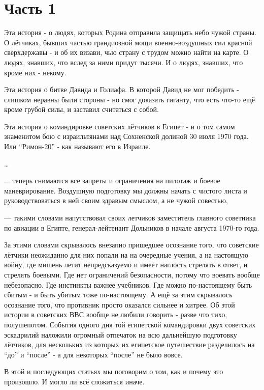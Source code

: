 \chapter{Часть 1}

Эта история - о людях, которых Родина отправила защищать небо чужой страны. О лётчиках, бывших частью грандиозной мощи военно-воздушных сил красной сверхдержавы - и об их визави, чью страну с трудом можно найти на карте. О людях, знавших, что вслед за ними придут тысячи. И о людях, знавших, что кроме них - некому.

Эта история о битве Давида и Голиафа. В которой Давид не мог победить - слишком неравны были стороны - но смог доказать гиганту, что есть что-то ещё кроме грубой силы, и заставил считаться с собой.

Эта история о командировке советских лётчиков в Египет - и о том самом знаменитом бою с израильтянами над Сохненской долиной 30 июля 1970 года. Или “Римон-20” - как называют его в Израиле.

…
\begin{textcitation}
	$\ldots$
	теперь снимаются все запреты и ограничения на пилотаж и боевое маневрирование. Воздушную подготовку мы должны начать с чистого листа и руководствоваться в ней своим здравым смыслом, а не чужой совестью,
\end{textcitation}
--- такими словами напутствовал своих летчиков заместитель главного советника по авиации в Египте, генерал-лейтенант Дольников в начале августа 1970-го года.

За этими словами скрывалось внезапно пришедшее осознание того, что советские лётчики неожиданно для них попали на на очередные учения, а на настоящую войну, где мишень летит непредсказуемо и имеет наглость стрелять в ответ, и стрелять боевыми. Где нет ограничений безопасности, потому что воевать вообще небезопасно. Где инстинкты важнее учебников. Где можно по-настоящему быть сбитым - и быть убитым тоже по-настоящему. А ещё за этим скрывалось осознание того, что противник просто оказался сильнее и хитрее. Об этой истории в советских ВВС вообще не любили говорить - разве что тихо, полушепотом. События одного дня той египетской командировки двух советских эскадрилий наложили огромный отпечаток на всю дальнейшую подготовку лётчиков, для нескольких из которых их египетское путешествие разделилось на “до” и “после” - а для некоторых “после” не было вовсе.

В этой и последующих статьях мы поговорим о том, как и почему это произошло. И могло ли всё сложиться иначе.

